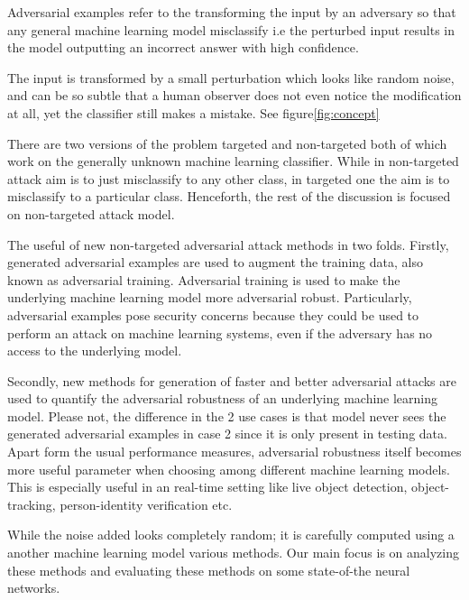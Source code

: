 \documentclass[letterpaper]{article} %
\begin{document}
\noindent Adversarial examples refer to the transforming the input by an adversary so that any general machine learning model misclassify i.e the perturbed input results in the model outputting an incorrect answer with high confidence.

The input is transformed by a small perturbation which looks like random noise, and can be so subtle that a human observer does not even notice the modification at all, yet the classifier still makes a mistake. See figure\ref{fig:concept}

There are two versions of the problem targeted and non-targeted both of which work on the generally unknown machine learning classifier. While in non-targeted attack aim is to just misclassify to any other class, in targeted one the aim is to misclassify to a particular class. Henceforth, the rest of the discussion is focused on non-targeted attack model.

The useful of new non-targeted adversarial attack methods in two folds. Firstly, generated adversarial examples are used to augment the training data, also known as adversarial training. Adversarial training is used to make the underlying machine learning model more adversarial robust.  Particularly, adversarial examples pose security concerns because they could be used to perform an attack on machine learning systems, even if the adversary has no access to the underlying model. 

Secondly, new methods for generation of faster and better adversarial attacks are used to quantify the adversarial robustness of an underlying machine learning model. 
Please not, the difference in the 2 use cases is that model never sees the generated adversarial examples in case 2 since it is only present in testing data. Apart form the usual performance measures, adversarial robustness itself becomes more useful parameter when choosing among different machine learning models. This is especially useful in an real-time setting like live object detection, object-tracking, person-identity verification etc.

While the noise added looks completely random; it is carefully computed using a another machine learning model various methods. Our main focus is on analyzing these methods and evaluating these methods on some state-of-the neural networks.
\end{document}
